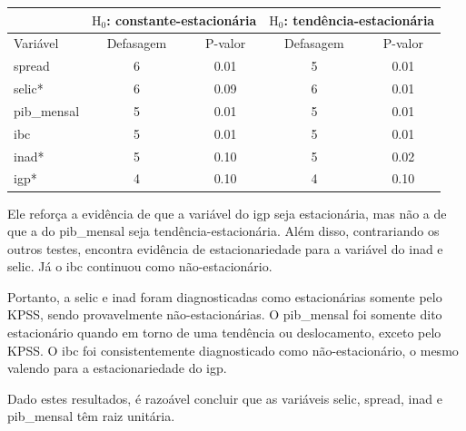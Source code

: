 \documentclass[a4paper,
               article,
               12pt,
               openany,
               oneside,
               english,
               brazil]{abntex2}
\numberwithin{equation}{section}
\begin{document}
    \begin{table}[ht]
        {%
            \begin{tabular}{lcccc}
                \midrule
                & \multicolumn{2}{C{5cm}}{$ \text{H}_0 $: constante-estacionária} & \multicolumn{2}{C{5cm}}{$ \text{H}_0 $: tendência-estacionária} \\
                \midrule
                Variável & Defasagem & P-valor & Defasagem & P-valor \\
                \midrule
                spread     &          6 &     0.01 &          5 &     0.01 \\
                selic*      &          6 &     0.09 &          6 &     0.01 \\
                pib\_mensal &          5 &     0.01 &          5 &     0.01 \\
                ibc        &          5 &     0.01 &          5 &     0.01 \\
                inad*       &          5 &     0.10 &          5 &     0.02 \\
                igp*        &          4 &     0.10 &          4 &     0.10 \\
                \midrule
            \end{tabular}
            } 
            {}
    \end{table}

    Ele reforça a evidência de que a variável do igp seja estacionária, mas não a de que a do pib\_mensal seja tendência-estacionária. Além disso, contrariando os outros testes, encontra evidência de estacionariedade para a variável do inad e selic. Já o ibc continuou como não-estacionário.

    Portanto, a selic e inad foram diagnosticadas como estacionárias somente pelo KPSS\@, sendo provavelmente não-estacionárias. O pib\_mensal foi somente dito estacionário quando em torno de uma tendência ou deslocamento, exceto pelo KPSS\@. O ibc foi consistentemente diagnosticado como não-estacionário, o mesmo valendo para a estacionariedade do igp.

    Dado estes resultados, é razoável concluir que as variáveis selic, spread, inad e pib\_mensal têm raiz unitária. 
    
\end{document}
